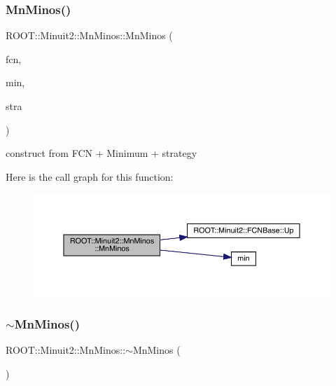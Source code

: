 \subsubsection{\texorpdfstring{MnMinos()}{MnMinos()}\hspace{0.1cm}{\footnotesize\ttfamily [2/4]}}
{\footnotesize\ttfamily R\+O\+O\+T\+::\+Minuit2\+::\+Mn\+Minos\+::\+Mn\+Minos (\begin{DoxyParamCaption}\item[{const \mbox{\hyperlink{classROOT_1_1Minuit2_1_1FCNBase}{F\+C\+N\+Base}} \&}]{fcn,  }\item[{const \mbox{\hyperlink{classROOT_1_1Minuit2_1_1FunctionMinimum}{Function\+Minimum}} \&}]{min,  }\item[{const \mbox{\hyperlink{classROOT_1_1Minuit2_1_1MnStrategy}{Mn\+Strategy}} \&}]{stra }\end{DoxyParamCaption})}



construct from F\+CN + Minimum + strategy 

Here is the call graph for this function\+:\nopagebreak
\begin{figure}[H]
\begin{center}
\leavevmode
\includegraphics[width=350pt]{dc/d91/classROOT_1_1Minuit2_1_1MnMinos_a80f912ade0dd48d937bc04b14e28623c_cgraph}
\end{center}
\end{figure}
\mbox{\label{classROOT_1_1Minuit2_1_1MnMinos_a64625d0dd4308a7c8fb8930c980f11bd}} 
\subsubsection{\texorpdfstring{$\sim$MnMinos()}{~MnMinos()}\hspace{0.1cm}{\footnotesize\ttfamily [1/2]}}
{\footnotesize\ttfamily R\+O\+O\+T\+::\+Minuit2\+::\+Mn\+Minos\+::$\sim$\+Mn\+Minos (\begin{DoxyParamCaption}{ }\end{DoxyParamCaption})\hspace{0.3cm}{\ttfamily [inline]}}

